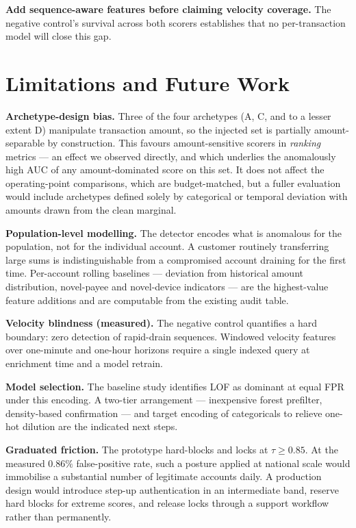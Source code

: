 \documentclass[journal]{IEEEtran}
\begin{document}
\textbf{Add sequence-aware features before claiming velocity coverage.}
The negative control's survival across both scorers establishes that no
per-transaction model will close this gap.

\section{Limitations and Future Work}
\label{sec:limits}

\textbf{Archetype-design bias.} Three of the four archetypes (A, C, and to a
lesser extent D) manipulate transaction amount, so the injected set is
partially amount-separable by construction. This favours amount-sensitive
scorers in \emph{ranking} metrics --- an effect we observed directly, and
which underlies the anomalously high AUC of any amount-dominated score on
this set. It does not affect the operating-point comparisons, which are
budget-matched, but a fuller evaluation would include archetypes defined
solely by categorical or temporal deviation with amounts drawn from the
clean marginal.

\textbf{Population-level modelling.} The detector encodes what is anomalous
for the population, not for the individual account. A customer routinely
transferring large sums is indistinguishable from a compromised account
draining for the first time. Per-account rolling baselines --- deviation
from historical amount distribution, novel-payee and novel-device
indicators --- are the highest-value feature additions and are computable
from the existing audit table.

\textbf{Velocity blindness (measured).} The negative control quantifies a
hard boundary: zero detection of rapid-drain sequences. Windowed velocity
features over one-minute and one-hour horizons require a single indexed
query at enrichment time and a model retrain.

\textbf{Model selection.} The baseline study identifies LOF as dominant at
equal FPR under this encoding. A two-tier arrangement --- inexpensive forest
prefilter, density-based confirmation --- and target encoding of
categoricals to relieve one-hot dilution are the indicated next steps.

\textbf{Graduated friction.} The prototype hard-blocks and locks at
$\tau \geq 0.85$. At the measured $0.86\%$ false-positive rate, such a
posture applied at national scale would immobilise a substantial number of
legitimate accounts daily. A production design would introduce step-up
authentication in an intermediate band, reserve hard blocks for extreme
scores, and release locks through a support workflow rather than
permanently.
\end{document}
